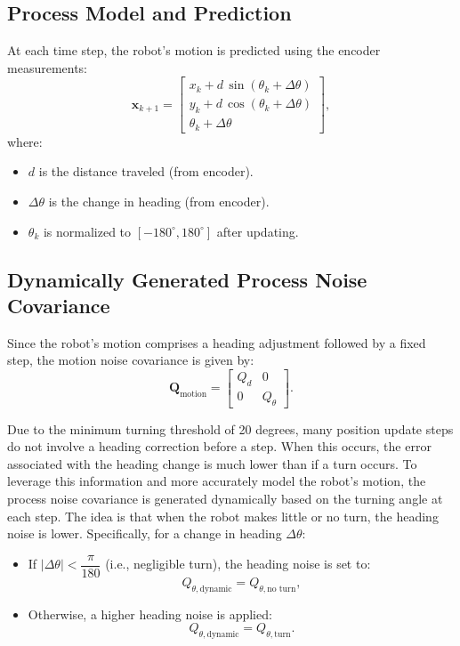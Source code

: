 \subsection*{Process Model and Prediction}

At each time step, the robot’s motion is predicted using the encoder measurements:
\[
\bm{x}_{k+1} =
\begin{bmatrix}
x_k + d \,\sin(\theta_k + \Delta\theta) \\
y_k + d \,\cos(\theta_k + \Delta\theta) \\
\theta_k + \Delta\theta
\end{bmatrix},
\]
where:
\begin{itemize}
    \item \(d\) is the distance traveled (from encoder).
    \item \(\Delta\theta\) is the change in heading (from encoder).
    \item \(\theta_k\) is normalized to \([-180^\circ, 180^\circ]\) after updating.
\end{itemize}

\subsection*{Dynamically Generated Process Noise Covariance}

Since the robot's motion comprises a heading adjustment followed by a fixed step, the motion noise covariance is given by:
\[
\bm{Q}_{\text{motion}} = \begin{bmatrix} Q_{d} & 0 \\ 0 & Q_{\theta} \end{bmatrix}.
\]

Due to the minimum turning threshold of 20 degrees, many position update steps do not involve a heading correction before a step. When this occurs, the error associated with the heading change is much lower than if a turn occurs. To leverage this information and more accurately model the robot's motion, the process noise covariance is generated dynamically based on the turning angle at each step. The idea is that when the robot makes little or no turn, the heading noise is lower. Specifically, for a change in heading \(\Delta \theta\):
\begin{itemize}
    \item If \(|\Delta \theta| < \dfrac{\pi}{180}\) (i.e., negligible turn), the heading noise is set to:
    \[
    Q_{\theta,\text{dynamic}} = Q_{\theta,\text{no turn}},
    \]
    \item Otherwise, a higher heading noise is applied:
    \[
    Q_{\theta,\text{dynamic}} = Q_{\theta,\text{turn}}.
    \]
\end{itemize}

